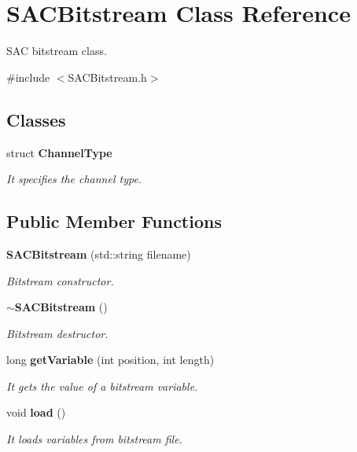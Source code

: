 \section{S\+A\+C\+Bitstream Class Reference}
\label{class_s_a_c_bitstream}


S\+AC bitstream class.  




{\ttfamily \#include $<$S\+A\+C\+Bitstream.\+h$>$}

\subsection*{Classes}
\begin{DoxyCompactItemize}
\item 
struct \textbf{ Channel\+Type}
\begin{DoxyCompactList}\small\item\em It specifies the channel type. \end{DoxyCompactList}\end{DoxyCompactItemize}
\subsection*{Public Member Functions}
\begin{DoxyCompactItemize}
\item 
\textbf{ S\+A\+C\+Bitstream} (std\+::string filename)
\begin{DoxyCompactList}\small\item\em Bitstream constructor. \end{DoxyCompactList}\item 
\textbf{ $\sim$\+S\+A\+C\+Bitstream} ()
\begin{DoxyCompactList}\small\item\em Bitstream destructor. \end{DoxyCompactList}\item 
long \textbf{ get\+Variable} (int position, int length)
\begin{DoxyCompactList}\small\item\em It gets the value of a bitstream variable. \end{DoxyCompactList}\item 
void \textbf{ load} ()
\begin{DoxyCompactList}\small\item\em It loads variables from bitstream file. \end{DoxyCompactList}\end{DoxyCompactItemize}
